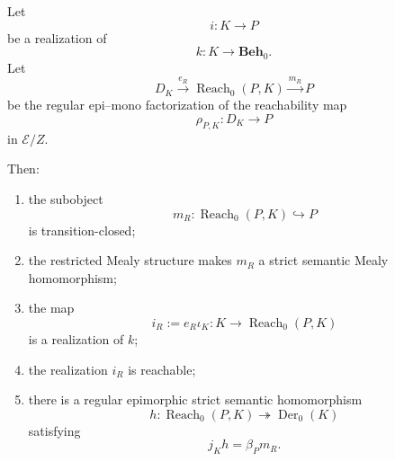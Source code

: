 \begin{proposition}
\label{prop:reachable-part}
    Let
    \[
        i:K\to P
    \]
    be a realization of
    \[
        k:K\to\mathbf{Beh}_0.
    \]
    Let
    \[
        D_K
            \xrightarrow{e_R}
        \operatorname{Reach}_0(P,K)
            \xrightarrow{m_R}
        P
    \]
    be the regular epi--mono factorization of the reachability map
    \[
        \rho_{P,K}:D_K\to P
    \]
    in \(\mathcal E/Z\).

    Then:

    \begin{enumerate}
        \item the subobject
        \[
            m_R:
            \operatorname{Reach}_0(P,K)\hookrightarrow P
        \]
        is transition-closed;

        \item the restricted Mealy structure makes \(m_R\) a strict semantic
        Mealy homomorphism;

        \item the map
        \[
            i_R:=e_R\iota_K:
            K\to\operatorname{Reach}_0(P,K)
        \]
        is a realization of \(k\);

        \item the realization \(i_R\) is reachable;

        \item there is a regular epimorphic strict semantic homomorphism
        \[
            h:
            \operatorname{Reach}_0(P,K)
            \twoheadrightarrow
            \operatorname{Der}_0(K)
        \]
        satisfying
        \[
            j_Kh=\beta_Pm_R.
        \]
    \end{enumerate}
\end{proposition}
